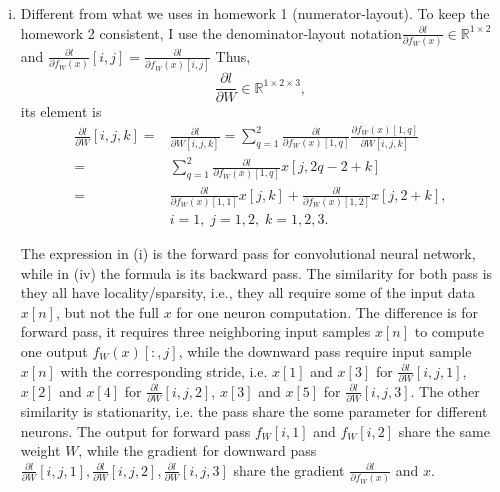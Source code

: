 \documentclass[10pt,a4paper]{article}
\theoremstyle{dotlessP}
\def\RR{\mathbb{R}}
\begin{document}
\begin{enumerate}[(a)]
\begin{enumerate}[(i)]
		\item Different from what we uses in homework 1 (numerator-layout). To keep the homework 2 consistent, I use the denominator-layout notation$\frac{\partial l}{\partial f_W(x)}\in \RR^{1\times 2}$ and $\frac{\partial l}{\partial f_W(x)}[i,j]=\frac{\partial l}{\partial f_W(x)[i,j]}$ Thus, 
		\begin{equation}
		\frac{\partial l}{\partial W}\in \RR^{1\times 2 \times 3},
		\end{equation}
		its element is 
		\begin{equation}
		\begin{aligned}
		\frac{\partial l}{\partial W}[i,j,k]=&\frac{\partial l}{\partial W[i,j,k]}
		= \sum_{q=1}^2\frac{\partial l}{\partial f_W(x)[1,q]}\frac{\partial f_W(x)[1,q]}{\partial W[i,j,k]}\\
		=&\sum_{q=1}^2\frac{\partial l}{\partial f_W(x)[1,q]} x[j,2q-2+k]\\
		= &\frac{\partial l}{\partial f_W(x)[1,1]} x[j,k]+\frac{\partial l}{\partial f_W(x)[1,2]} x[j,2+k], \\
		&i=1,\; j=1,2,\; k=1,2,3.
		\end{aligned}
		\end{equation}
		
		The expression in (i) is the forward pass for convolutional neural network, while in (iv) the formula is its backward pass. The similarity for both pass is they all have locality/sparsity, i.e., they all require some of the input data $x[n]$, but not the full $x$ for one neuron computation. The difference is for forward pass, it requires three neighboring input samples $x[n]$ to compute one output $f_W(x)[:,j]$, while the downward pass require input sample $x[n]$ with the corresponding stride, i.e. $x[1]$ and $x[3]$ for $\frac{\partial l}{\partial W}[i,j,1]$, $x[2]$ and $x[4]$ for $\frac{\partial l}{\partial W}[i,j,2]$, $x[3]$ and $x[5]$ for $\frac{\partial l}{\partial W}[i,j,3]$. The other similarity is stationarity, i.e. the pass share the some parameter for different neurons. The output for forward pass $f_W[i,1]$ and $f_W[i,2]$ share the same weight $W$, while the gradient for downward pass $\frac{\partial l}{\partial W}[i,j,1], \frac{\partial l}{\partial W}[i,j,2], \frac{\partial l}{\partial W}[i,j,3]$ share the gradient $\frac{\partial l}{\partial f_W(x)}$ and $x$.
	\end{enumerate}
\end{enumerate}
\newpage
\end{document}

